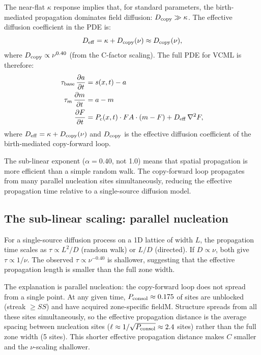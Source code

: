 \documentclass[11pt]{article}
\begin{document}
The near-flat $\kappa$ response implies that, for standard parameters,
the birth-mediated propagation dominates field diffusion:
$D_{\rm copy} \gg \kappa$.
The effective diffusion coefficient in the PDE is:
\begin{equation}
  D_{\rm eff} = \kappa + D_{\rm copy}(\nu) \approx D_{\rm copy}(\nu),
\end{equation}
where $D_{\rm copy} \propto \nu^{0.40}$ (from the C-factor scaling).
The full PDE for VCML is therefore:
\begin{align}
  \tau_{\rm base}\,\frac{\partial a}{\partial t} &= s(x,t) - a \\
  \tau_m\,\frac{\partial m}{\partial t}          &= a - m \\
  \frac{\partial F}{\partial t}                  &= P_c(x,t)\cdot FA\cdot(m - F)
                                                    + D_{\rm eff}\,\nabla^2 F,
\end{align}
where $D_{\rm eff} = \kappa + D_{\rm copy}(\nu)$ and $D_{\rm copy}$ is the
effective diffusion coefficient of the birth-mediated copy-forward loop.

The sub-linear exponent ($\alpha = 0.40$, not 1.0) means that spatial
propagation is more efficient than a simple random walk.
The copy-forward loop propagates from many parallel nucleation sites simultaneously,
reducing the effective propagation time relative to a single-source diffusion model.

\subsection{The sub-linear scaling: parallel nucleation}

For a single-source diffusion process on a 1D lattice of width $L$,
the propagation time scales as $\tau \propto L^2/D$ (random walk) or $L/D$ (directed).
If $D \propto \nu$, both give $\tau \propto 1/\nu$.
The observed $\tau \propto \nu^{-0.40}$ is shallower, suggesting that the effective
propagation length is smaller than the full zone width.

The explanation is parallel nucleation:
the copy-forward loop does not spread from a single point.
At any given time, $P_{\rm consol} \approx 0.175$ of sites are unblocked (streak $\geq SS$)
and have acquired zone-specific fieldM.
Structure spreads from all these sites simultaneously, so the effective propagation
distance is the average spacing between nucleation sites ($\ell \approx 1/\sqrt{P_{\rm consol}} \approx 2.4$ sites)
rather than the full zone width (5 sites).
This shorter effective propagation distance makes $C$ smaller and the $\nu$-scaling shallower.
\end{document}
